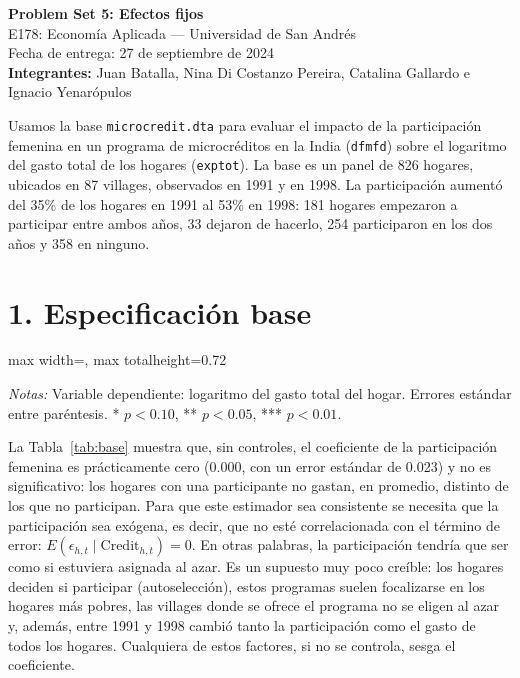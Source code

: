 \documentclass[11pt,a4paper]{article}
\newcommand{\tabla}[1]{\begin{adjustbox}{max width=\linewidth, max totalheight=0.72\textheight}\end{adjustbox}}
\newcommand{\notas}[1]{\par\vspace{0.3em}\begin{minipage}{0.92\linewidth}\footnotesize\textit{Notas:} #1\end{minipage}}
\begin{document}
\begin{center}
{\Large\bfseries Problem Set 5: Efectos fijos}\\[0.5em]
E178: Economía Aplicada --- Universidad de San Andrés\\
Fecha de entrega: 27 de septiembre de 2024\\[0.5em]
\textbf{Integrantes:} Juan Batalla, Nina Di Costanzo Pereira, Catalina Gallardo e Ignacio Yenarópulos
\end{center}

Usamos la base \texttt{microcredit.dta} para evaluar el impacto de la participación femenina en un programa de microcréditos en la India (\texttt{dfmfd}) sobre el logaritmo del gasto total de los hogares (\texttt{exptot}). La base es un panel de 826 hogares, ubicados en 87 villages, observados en 1991 y en 1998. La participación aumentó del 35\% de los hogares en 1991 al 53\% en 1998: 181 hogares empezaron a participar entre ambos años, 33 dejaron de hacerlo, 254 participaron en los dos años y 358 en ninguno.

\section*{1. Especificación base}

\begin{table}[H]\centering
\caption{Especificación base (MCO)}\label{tab:base}
\tabla{"../output/Tabla 1.tex"}
\notas{Variable dependiente: logaritmo del gasto total del hogar. Errores estándar entre paréntesis. * $p<0.10$, ** $p<0.05$, *** $p<0.01$.}
\end{table}

La Tabla~\ref{tab:base} muestra que, sin controles, el coeficiente de la participación femenina es prácticamente cero (0.000, con un error estándar de 0.023) y no es significativo: los hogares con una participante no gastan, en promedio, distinto de los que no participan. Para que este estimador sea consistente se necesita que la participación sea exógena, es decir, que no esté correlacionada con el término de error: $E(\epsilon_{h,t}\mid \text{Credit}_{h,t})=0$. En otras palabras, la participación tendría que ser como si estuviera asignada al azar. Es un supuesto muy poco creíble: los hogares deciden si participar (autoselección), estos programas suelen focalizarse en los hogares más pobres, las villages donde se ofrece el programa no se eligen al azar y, además, entre 1991 y 1998 cambió tanto la participación como el gasto de todos los hogares. Cualquiera de estos factores, si no se controla, sesga el coeficiente.
\end{document}
